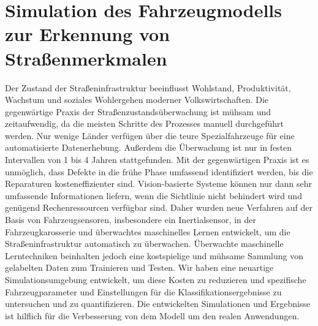 

\thispagestyle{empty}
\section*{Simulation des Fahrzeugmodells zur Erkennung von Straßenmerkmalen}


Der Zustand der Straßeninfrastruktur beeinflusst Wohlstand, Produktivität, Wachstum und soziales Wohlergehen moderner Volkswirtschaften.
%
Die gegenwärtige Praxis der Straßenzustandsüberwachung ist mühsam und zeitaufwendig, da die meisten Schritte des Prozesses manuell durchgeführt werden.
%
Nur wenige Länder verfügen über die teure Spezialfahrzeuge für eine automatisierte Datenerhebung.
%
Außerdem die Überwachung ist nur in festen Intervallen von 1 bis 4 Jahren stattgefunden.
%
Mit der gegenwärtigen Praxis ist es unmöglich, dass Defekte in die frühe Phase umfassend identifiziert werden, bis die Reparaturen kosteneffizienter sind.
%
Vision-basierte Systeme können nur dann sehr umfassende Informationen liefern, wenn die Sichtlinie nicht behindert wird und genügend Rechenressourcen verfügbar sind.
%
Daher wurden neue Verfahren auf der Basis von Fahrzeugsensoren, insbesondere ein Inertialsensor, in der Fahrzeugkarosserie und überwachtes maschinelles Lernen entwickelt, um die Straßeninfrastruktur automatisch zu überwachen.
%
Überwachte maschinelle Lerntechniken beinhalten jedoch eine kostspielige und mühsame Sammlung von gelabelten Daten zum Trainieren und Testen.
%
Wir haben eine neuartige Simulationsumgebung entwickelt, um diese Kosten zu reduzieren und spezifische Fahrzeugparameter und Einstellungen für die Klassifikationsergebnisse zu untersuchen und zu quantifizieren.
%
Die entwickelten Simulationen und Ergebnisse ist hilflich für die Verbesserung von dem Modell um den realen Anwendungen.